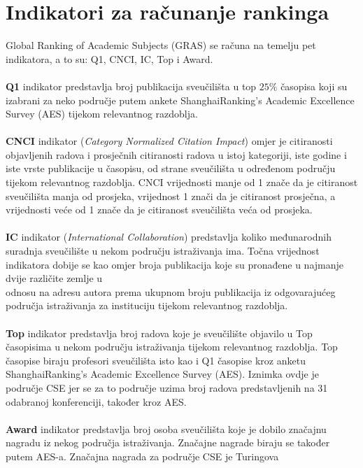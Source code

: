 \documentclass[times, utf8, zavrsni]{fer}
\begin{document}
\section{Indikatori za računanje rankinga}
\label{indikatori}
Global Ranking of Academic Subjects (GRAS) se računa na temelju pet indikatora, a to su: Q1, CNCI, IC, Top i Award.
\\ \\\textbf{Q1} indikator predstavlja broj publikacija sveučilišta u top $25\%$ časopisa koji su izabrani za neko područje putem ankete ShanghaiRanking’s Academic Excellence Survey
(AES) tijekom relevantnog razdoblja.   
\\ \\\textbf{CNCI} indikator (\emph{Category Normalized Citation Impact}) omjer je citiranosti \\objavljenih radova i prosječnih citiranosti 
radova u istoj kategoriji, iste godine i iste vrste publikacije u časopisu, od strane sveučilišta u određenom području tijekom relevantnog razdoblja.
CNCI vrijednosti manje od 1 znače da je citiranost sveučilišta manja od prosjeka, vrijednost 1 znači da je citiranost prosječna, a vrijednosti veće od
1 znače da je citiranost sveučilišta veća od prosjeka.
\\ \\\textbf{IC} indikator (\emph{International Collaboration}) predstavlja koliko međunarodnih suradnja sveučilište u nekom području istraživanja ima.
Točna vrijednost indikatora dobije se kao omjer broja publikacija koje su pronađene u najmanje dvije različite zemlje 
u \\odnosu na adresu autora prema ukupnom broju publikacija iz odgovarajućeg područja istraživanja za instituciju tijekom relevantnog razdoblja.
\\ \\\textbf{Top} indikator predstavlja broj radova koje je sveučilište 
objavilo u Top časopisima u nekom području istraživanja tijekom relevantnog razdoblja.
Top časopise biraju profesori sveučilišta isto kao i Q1 časopise kroz anketu ShanghaiRanking’s Academic Excellence Survey (AES). 
Iznimka ovdje je područje CSE jer se za to područje uzima broj radova predstavljenih na 31 odabranoj konferenciji, 
također kroz AES.
\\ \\\textbf{Award} indikator predstavlja broj osoba sveučilišta koje je dobilo značajnu nagradu iz nekog područja istraživanja. Značajne nagrade 
biraju se također putem AES-a. Značajna nagrada za područje CSE je Turingova 
\end{document}
